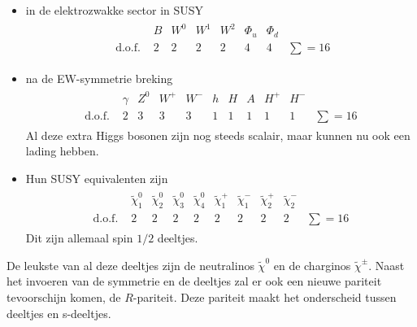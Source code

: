 \documentclass[../main.tex]{subfiles}
\begin{document}
\begin{itemize}
    \item in de elektrozwakke sector in SUSY
        \begin{equation}
            \begin{aligned}
                \label{eq:susy_deeltjes_5}
                \begin{array}{llcccccc} 
                    & B & W^{0} & W^{1} & W^{2} & \Phi_{u} & \Phi_{d} & \\
                    \text { d.o.f. } & 2 & 2 & 2 & 2 & 4 & 4 & \sum=16
                \end{array}
            \end{aligned}
        \end{equation}
    \item na de EW-symmetrie breking
        \begin{equation}
            \begin{aligned}
                \label{eq:susy_deeltjes_6}
                \begin{array}{lllclllllll} 
                    & \gamma & Z^{0} & W^{+} & W^{-} & h & H & A & H^{+} & H^{-} & \\
                    \text {d.o.f. } & 2 & 3 & 3 & 3 & 1 & 1 & 1 & 1 & 1 & \sum=16
                \end{array}
            \end{aligned}
        \end{equation}
        Al deze extra Higgs bosonen zijn nog steeds scalair, maar kunnen nu ook een lading hebben.
    \item Hun SUSY equivalenten zijn
        \begin{equation}
            \begin{aligned}
                \label{eq:susy_deeltjes_7}
                \begin{array}{lccccccccc} 
                    & \tilde{\chi}_{1}^{0} & \tilde{\chi}_{2}^{0} & \tilde{\chi}_{3}^{0} & \tilde{\chi}_{4}^{0} & \tilde{\chi}_{1}^{+} & \tilde{\chi}_{1}^{-} & \tilde{\chi}_{2}^{+} & \tilde{\chi}_{2}^{-} & \\
                    \text {d.o.f. } & 2 & 2 & 2 & 2 & 2 & 2 & 2 & 2 & \sum=16
                \end{array}
            \end{aligned}
        \end{equation}
        Dit zijn allemaal spin $1/2$ deeltjes.
\end{itemize}
De leukste van al deze deeltjes zijn de neutralinos $\tilde{\chi}^{0}$ en de charginos $\tilde{\chi}^{\pm}$. Naast het invoeren van de symmetrie en de deeltjes zal er ook een nieuwe pariteit tevoorschijn komen, de $R$-pariteit. Deze pariteit maakt het onderscheid tussen deeltjes en s-deeltjes.
\end{document}
